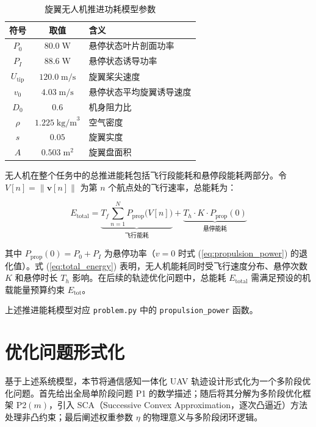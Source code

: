 \begin{table}[htbp]
\centering
\caption{旋翼无人机推进功耗模型参数}
\label{tab:energy_params}
\begin{tabular}{ccl}
\hline
\textbf{符号} & \textbf{取值} & \textbf{含义} \\
\hline
$P_0$     & $80.0\;\text{W}$  & 悬停状态叶片剖面功率 \\
$P_I$     & $88.6\;\text{W}$  & 悬停状态诱导功率 \\
$U_{\mathrm{tip}}$ & $120.0\;\text{m/s}$ & 旋翼桨尖速度 \\
$v_0$     & $4.03\;\text{m/s}$ & 悬停状态平均旋翼诱导速度 \\
$D_0$     & $0.6$ & 机身阻力比 \\
$\rho$    & $1.225\;\text{kg/m}^3$ & 空气密度 \\
$s$       & $0.05$ & 旋翼实度 \\
$A$       & $0.503\;\text{m}^2$ & 旋翼盘面积 \\
\hline
\end{tabular}
\end{table}

无人机在整个任务中的总推进能耗包括飞行段能耗和悬停段能耗两部分。令 $V[n]=\|\mathbf{v}[n]\|$ 为第 $n$ 个航点处的飞行速率，总能耗为：

\begin{equation}
E_{\mathrm{total}}=\underbrace{T_f\sum_{n=1}^{N}P_{\mathrm{prop}}\bigl(V[n]\bigr)}_{\text{飞行能耗}}+\underbrace{T_h\cdot K\cdot P_{\mathrm{prop}}(0)}_{\text{悬停能耗}}
\label{eq:total_energy}
\end{equation}

其中 $P_{\mathrm{prop}}(0)=P_0+P_I$ 为悬停功率（$v=0$ 时式 (\ref{eq:propulsion_power}) 的退化值）。式 (\ref{eq:total_energy}) 表明，无人机能耗同时受飞行速度分布、悬停次数 $K$ 和悬停时长 $T_h$ 影响。在后续的轨迹优化问题中，总能耗 $E_{\mathrm{total}}$ 需满足预设的机载能量预算约束 $E_{\mathrm{tot}}$。

上述推进能耗模型对应 \texttt{problem.py} 中的 \texttt{propulsion\_power} 函数。

\section{优化问题形式化}

基于上述系统模型，本节将通信感知一体化 UAV 轨迹设计形式化为一个多阶段优化问题。首先给出全局单阶段问题 P1 的数学描述；随后将其分解为多阶段优化框架 P2$(m)$，引入 SCA（Successive Convex Approximation，逐次凸逼近）方法处理非凸约束；最后阐述权重参数 $\eta$ 的物理意义与多阶段闭环逻辑。

